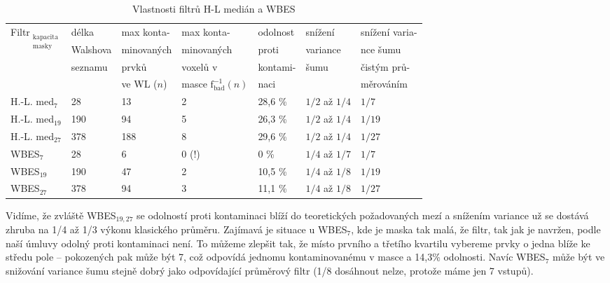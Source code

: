 \begin{table}[h]
    \hspace{-0.7cm}
    \begin{tabular}{lllllll}
      \toprule
      \multirow{4}{*}{Filtr$_{\mathrm{\substack{kapacita\\ masky}}}$} &délka&max konta-& max konta- & odolnost    & snížení    & snížení varia- \\
                                        &Walshova& minovaných & minovaných & proti       & variance   & nce šumu      \\
                                        &seznamu& prvků       & voxelů v   & kontami-    & šumu       & čistým prů-     \\
                                        &       & ve WL ($n$) & masce $\mathrm{f_{bad}^{-1}}(n)$ & naci &  & měrováním  \\
      \midrule
      H.-L. med$_{\mathrm{7}}$            & 28  & 13  & 2                 & 28,6 \%       & $1/2$ až $1/4$    & $1/7$ \\
      H.-L. med$_{\mathrm{19}}$           & 190 & 94  & 5                 & 26,3 \%       & $1/2$ až $1/4$    & $1/19$ \\
      H.-L. med$_{\mathrm{27}}$           & 378 & 188 & 8                 & 29,6 \%       & $1/2$ až $1/4$    & $1/27$  \\
      WBES$_{\mathrm{7}}$               & 28  & 6   & 0 (!)             & 0 \%          & $1/4$ až $1/7$    & $1/7$ \\
      WBES$_{\mathrm{19}}$              & 190 & 47  & 2                 & 10,5 \%       & $1/4$ až $1/8$    & $1/19$ \\
      WBES$_{\mathrm{27}}$              & 378 & 94  & 3                 & 11,1 \%       & $1/4$ až $1/8$    & $1/27$ \\
      \bottomrule
    \end{tabular}
    \caption{Vlastnosti filtrů H-L medián a WBES}
\end{table}\label{tab WBES}

     Vidíme, že zvláště WBES$_{\mathrm{19,27}}$ se odolností proti kontaminaci blíží do teoretických požadovaných mezí a snížením variance už se dostává zhruba na 1/4 až 1/3 výkonu klasického průměru. Zajímavá je situace u WBES$_{\mathrm{7}}$, kde je maska tak malá, že filtr, tak jak je navržen, podle naší úmluvy odolný proti kontaminaci není. To můžeme zlepšit tak, že místo prvního a třetího kvartilu vybereme prvky o jedna blíže ke středu pole -- pokozených pak může být 7, což odpovídá jednomu kontaminovanému v masce a 14,3\% odolnosti. Navíc WBES$_{\mathrm{7}}$ může být ve snižování variance šumu stejně dobrý jako odpovídající průměrový filtr (1/8 dosáhnout nelze, protože máme jen 7 vstupů).

